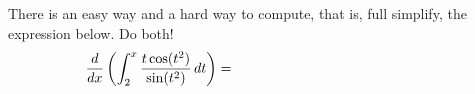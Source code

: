 There is an easy way and a hard way to compute, that is, full simplify, the expression below.  Do both!
    $$\frac{d}{dx}\left(\int_2^x \frac{t\cos(t^2)}{\sin(t^2)}\,dt\right) = \hspace{2.0in}$$
